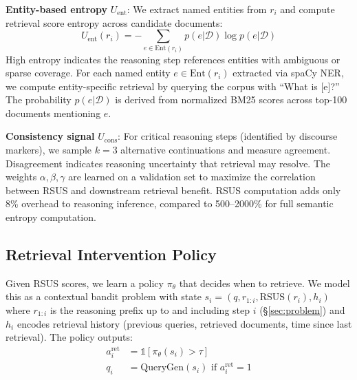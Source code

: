 \documentclass[sigconf,natbib=true]{acmart}
\begin{document}
\textbf{Entity-based entropy} $U_{\text{ent}}$: We extract named entities from $r_i$ and compute retrieval score entropy across candidate documents:
\begin{equation}
U_{\text{ent}}(r_i) = -\sum_{e \in \text{Ent}(r_i)} p(e | \mathcal{D}) \log p(e | \mathcal{D})
\end{equation}
High entropy indicates the reasoning step references entities with ambiguous or sparse coverage. For each named entity $e \in \text{Ent}(r_i)$ extracted via spaCy NER, we compute entity-specific retrieval by querying the corpus with ``What is [e]?'' The probability $p(e | \mathcal{D})$ is derived from normalized BM25 scores across top-100 documents mentioning $e$.

\textbf{Consistency signal} $U_{\text{cons}}$: For critical reasoning steps (identified by discourse markers), we sample $k=3$ alternative continuations and measure agreement. Disagreement indicates reasoning uncertainty that retrieval may resolve. The weights $\alpha, \beta, \gamma$ are learned on a validation set to maximize the correlation between RSUS and downstream retrieval benefit. RSUS computation adds only 8\% overhead to reasoning inference, compared to 500--2000\% for full semantic entropy computation.

\subsection{Retrieval Intervention Policy}
Given RSUS scores, we learn a policy $\pi_\theta$ that decides when to retrieve. We model this as a contextual bandit problem with state $s_i = (q, r_{1:i}, \text{RSUS}(r_i), h_i)$ where $r_{1:i}$ is the reasoning prefix up to and including step $i$ (\S\ref{sec:problem}) and $h_i$ encodes retrieval history (previous queries, retrieved documents, time since last retrieval). The policy outputs:
\begin{align}
a_i^{\text{ret}} &= \mathbb{1}[\pi_\theta(s_i) > \tau] \\
q_i &= \text{QueryGen}(s_i) \text{ if } a_i^{\text{ret}} = 1
\end{align}
\end{document}
